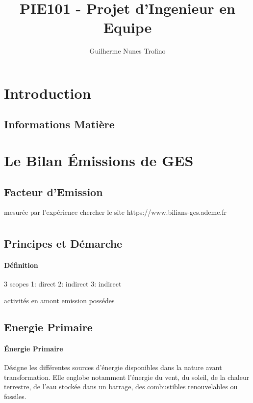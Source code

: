 \documentclass{article}
\title{PIE101 - Projet d'Ingenieur en Equipe}
\author{Guilherme Nunes Trofino}
\begin{document}
\maketitle

\newpage\tableofcontents

\section{Introduction}



\subsection{Informations Matière}

\section{Le Bilan Émissions de GES}
\subsection{Facteur d'Emission}
mesurée par l'expérience
chercher le site https://www.bilians-ges.ademe.fr


\section{}
\subsection{Principes et Démarche}
\paragraph{Définition}
3 scopes
1: direct
2: indirect
3: indirect

activités en amont
emission possédes

\subsection{Energie Primaire}
\paragraph{Énergie Primaire}Désigne les différentes sources d'énergie disponibles dans la nature avant transformation. Elle englobe notamment l'énergie du vent, du soleil, de la chaleur terrestre, de l'eau stockée dans un barrage, des combustibles renouvelables ou fossiles.
\end{document}
